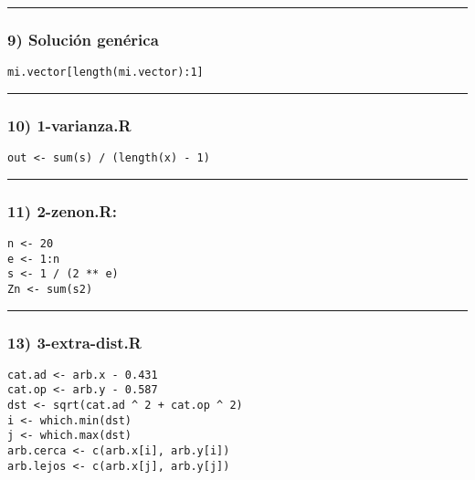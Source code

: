 \documentclass[]{article}
\begin{document}
\begin{center}\rule{3in}{0.4pt}\end{center}

\subsubsection{9) Solución genérica}

\begin{verbatim}
mi.vector[length(mi.vector):1]
\end{verbatim}
\begin{center}\rule{3in}{0.4pt}\end{center}

\subsubsection{10) 1-varianza.R}

\begin{verbatim}
out <- sum(s) / (length(x) - 1)
\end{verbatim}
\begin{center}\rule{3in}{0.4pt}\end{center}

\subsubsection{11) 2-zenon.R:}

\begin{verbatim}
n <- 20
e <- 1:n
s <- 1 / (2 ** e)
Zn <- sum(s2)
\end{verbatim}
\begin{center}\rule{3in}{0.4pt}\end{center}

\subsubsection{13) 3-extra-dist.R}

\begin{verbatim}
cat.ad <- arb.x - 0.431
cat.op <- arb.y - 0.587
dst <- sqrt(cat.ad ^ 2 + cat.op ^ 2)
i <- which.min(dst)
j <- which.max(dst)
arb.cerca <- c(arb.x[i], arb.y[i])
arb.lejos <- c(arb.x[j], arb.y[j])
\end{verbatim}
\end{document}
